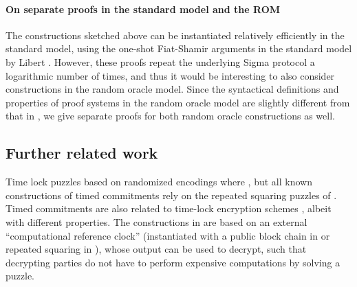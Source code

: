 \paragraph{On separate proofs in the standard model and the ROM}
The constructions sketched above can be instantiated relatively efficiently in the standard model, using the one-shot Fiat-Shamir arguments in the standard model by Libert \etal \cite{Libert2021OneShotFN}. However, these proofs repeat the underlying Sigma protocol a logarithmic number of times, and thus it would be interesting to also consider constructions in the random oracle model.
Since the syntactical definitions and properties of proof systems in the random oracle model are slightly different from that in \cite{Libert2021OneShotFN}, we give separate proofs for both random oracle constructions as well. 

\subsection{Further related work}
Time lock puzzles based on randomized encodings where \cite{TCC:BDGM19}, but all known constructions of timed commitments rely on the repeated squaring puzzles of \cite{RSW96}.
Timed commitments are also related to time-lock encryption schemes \cite{liu2018build,ECORICS:CJSS21}, albeit with different properties. The constructions in \cite{liu2018build,ECORICS:CJSS21} are based on an external ``computational reference clock'' (instantiated with a public block chain in \cite{liu2018build} or repeated squaring in \cite{cryptoeprint:2020/739}), whose output can be used to decrypt, such that decrypting parties do not have to perform expensive computations by solving a puzzle.






